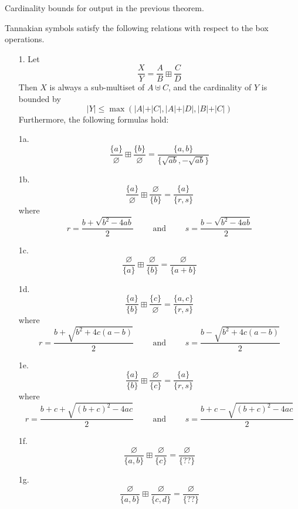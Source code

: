 \begin{corollary}
Cardinality bounds for output in the previous theorem.
\end{corollary}

\begin{theorem}
Tannakian symbols satisfy the following relations with respect to the box operations.
\begin{itemize}
\item[1.] Let $$\frac{X}{Y} = \frac{A}{B} \boxplus \frac{C}{D}$$
Then $X$ is always a sub-multiset of $A \uplus C$, and the cardinality of $Y$ is bounded by
$$ \vert Y \vert \leq \max ( \vert A \vert + \vert C \vert,  \vert A \vert + \vert D \vert,  \vert B \vert + \vert C \vert  )   $$
Furthermore, the following formulas hold:
\item[1a.] $$\frac{\{ a \} }{\varnothing} \boxplus \frac{ \{ b \} }{\varnothing} = \frac{ \{ a, b \}  }{ \{ \sqrt{ab} , -\sqrt{ab} \} }$$

\item[1b.] $$\frac{\{ a \} }{\varnothing} \boxplus \frac{\varnothing}{ \{ b \} } = \frac{ \{ a \}  }{ \{ r , s \} }$$
where
$$r = \frac{b + \sqrt{b^2 - 4ab}}{2} \qquad \text{\ and\ } \qquad s = \frac{b - \sqrt{b^2 - 4ab}}{2}$$

\item[1c.] $$\frac{\varnothing}{\{ a \} } \boxplus \frac{\varnothing}{ \{ b \} } = \frac{ \varnothing  }{ \{ a+b \} }$$

\item[1d.] $$ \frac{ \{ a \} }{ \{ b \}  }  \boxplus \frac{ \{ c \} }{ \varnothing  }   = \frac{\{ a, c  \}}{ \{ r, s \} }    $$
where
$$r = \frac{b + \sqrt{b^2+4c(a-b)}}{2} \qquad \text{\ and\ } \qquad s = \frac{b - \sqrt{b^2+4c(a-b)}}{2}$$

\item[1e.] $$ \frac{ \{ a \} }{ \{ b \}  }  \boxplus \frac{ \varnothing  }{ \{ c \} }  = \frac{\{ a  \}}{ \{ r, s \} }    $$
where
$$r = \frac{b+c + \sqrt{(b+c)^2 - 4ac}}{2} \qquad \text{\ and\ } \qquad s = \frac{b+c - \sqrt{(b+c)^2 - 4ac}}{2}$$

\item[1f.] $$\frac{\varnothing}{\{ a , b \} } \boxplus \frac{\varnothing}{ \{ c \} } = \frac{ \varnothing  }{ \{ ?? \} }$$



\item[1g.] $$\frac{\varnothing}{\{ a , b \} } \boxplus \frac{\varnothing}{ \{ c , d \} } = \frac{ \varnothing  }{ \{ ?? \} }$$



\end{itemize}
\end{theorem}
